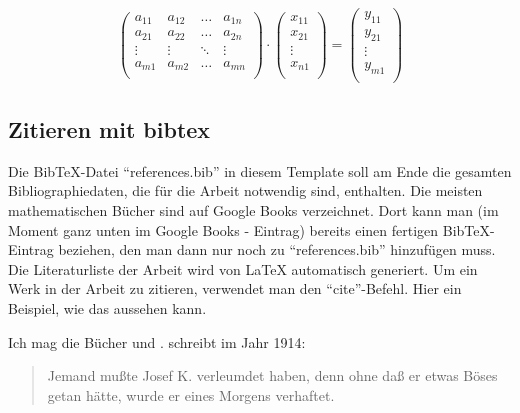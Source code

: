   \begin{align}\label{eq:rationals}
    \begin{pmatrix}
        a_{11} & a_{12} & \dots & a_{1n} \\ %
        a_{21} & a_{22} & \dots & a_{2n} \\ %
        \vdots & \vdots & \ddots & \vdots \\
        a_{m1} & a_{m2} & \dots & a_{mn} \\
    \end{pmatrix} \cdot
    \begin{pmatrix}
        x_{11} \\
        x_{21} \\
        \vdots \\
        x_{n1} \\
    \end{pmatrix} =
    \begin{pmatrix}
        y_{11} \\
        y_{21} \\
        \vdots \\
        y_{m1} \\
    \end{pmatrix} 
  \end{align}

\subsection{Zitieren mit bibtex}

Die BibTeX-Datei ``references.bib'' in diesem Template soll am Ende die gesamten Bibliographiedaten, die für die Arbeit notwendig sind, enthalten.
Die meisten mathematischen Bücher sind auf Google Books verzeichnet. Dort kann man (im Moment ganz unten im Google Books - Eintrag) bereits einen fertigen BibTeX-Eintrag beziehen, den man dann nur noch zu ``references.bib'' hinzufügen muss. Die Literaturliste der Arbeit wird von LaTeX automatisch generiert. Um ein Werk in der Arbeit zu zitieren, verwendet man den ``cite''-Befehl. Hier ein Beispiel, wie das aussehen kann.

Ich mag die Bücher \cite[]{kafka2015prozess} und \cite{AC02615918}. \textcite[S. 1]{kafka2015prozess} schreibt im Jahr 1914:
\begin{quote}
Jemand mußte Josef K. verleumdet haben, denn ohne daß er etwas Böses getan hätte, wurde er eines Morgens verhaftet.
\end{quote}

